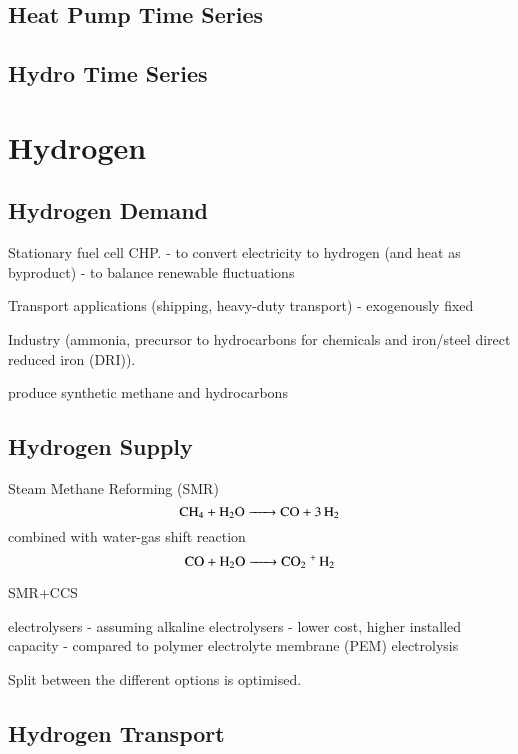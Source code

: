 \subsection{Heat Pump Time Series}


\subsection{Hydro Time Series}

\section{Hydrogen}

\subsection{Hydrogen Demand}

Stationary fuel cell CHP.
- to convert electricity to hydrogen (and heat as byproduct)
- to balance renewable fluctuations

Transport applications (shipping, heavy-duty transport)
- exogenously fixed

Industry (ammonia, precursor to hydrocarbons for chemicals and iron/steel direct reduced iron (DRI)).

produce synthetic methane and hydrocarbons

\subsection{Hydrogen Supply}

Steam Methane Reforming (SMR)
\begin{equation}
    \ce{ CH4 + H2O -> CO + 3H2 }
\end{equation}
combined with water-gas shift reaction
\begin{equation}
    \ce{CO + H2O -> \co + H2}
\end{equation}


SMR+CCS

electrolysers
- assuming alkaline electrolysers
- lower cost, higher installed capacity
- compared to polymer electrolyte membrane (PEM) electrolysis

Split between the different options is optimised.


\subsection{Hydrogen Transport}

